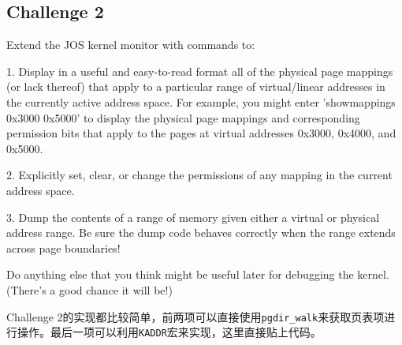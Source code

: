 \documentclass[11pt]{article}
\begin{document}
\subsection{Challenge 2}
\begin{framed}
Extend the JOS kernel monitor with commands to:

1. Display in a useful and easy-to-read format all of the physical page mappings (or lack thereof) that apply to a particular range of virtual/linear addresses in the currently active address space. For example, you might enter 'showmappings 0x3000 0x5000' to display the physical page mappings and corresponding permission bits that apply to the pages at virtual addresses 0x3000, 0x4000, and 0x5000.

2. Explicitly set, clear, or change the permissions of any mapping in the current address space.

3. Dump the contents of a range of memory given either a virtual or physical address range. Be sure the dump code behaves correctly when the range extends across page boundaries!

Do anything else that you think might be useful later for debugging the kernel. (There's a good chance it will be!)

\end{framed}
Challenge 2的实现都比较简单，前两项可以直接使用\lstinline|pgdir_walk|来获取页表项进行操作。最后一项可以利用\lstinline|KADDR|宏来实现，这里直接贴上代码。
\end{document}
